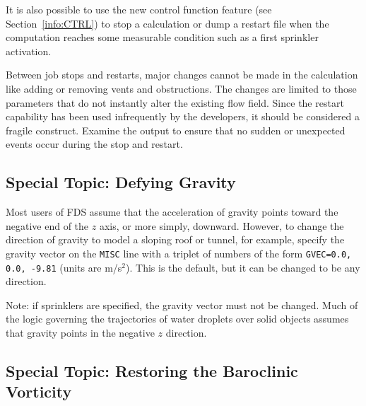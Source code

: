 \documentclass[11pt]{book}
\newcommand{\ct}{\tt\small}
\begin{document}
It is also possible to use the new control function feature (see Section~\ref{info:CTRL})
to stop a calculation or dump a restart file when the computation reaches
some measurable condition such as a first sprinkler activation.

Between job stops and restarts, major changes cannot be made in the calculation
like adding or removing vents and obstructions. The changes are limited to those parameters that do
not instantly alter the existing flow field. Since the restart
capability has been used infrequently by the developers, it should be considered
a fragile construct. Examine the output
to ensure that no sudden or unexpected events occur during the stop and
restart.


\subsection{Special Topic: Defying Gravity}
\label{info:GVEC}

Most users of FDS assume that the acceleration of gravity points toward
the negative end of the $z$ axis, or more simply, downward.
However, to change the direction of gravity to model
a sloping roof or tunnel, for example, specify the gravity
vector on the {\ct MISC} line with a triplet of numbers of the form
{\ct GVEC=0.0, 0.0, -9.81} (units are m/s$^2$). This is the default, but it
can be changed to be any direction.

Note: if sprinklers are specified, the gravity vector must not be
changed. Much of the logic governing the trajectories of water droplets
over solid objects assumes that gravity points in the negative $z$
direction.


\subsection{Special Topic: Restoring the Baroclinic Vorticity}
\end{document}
